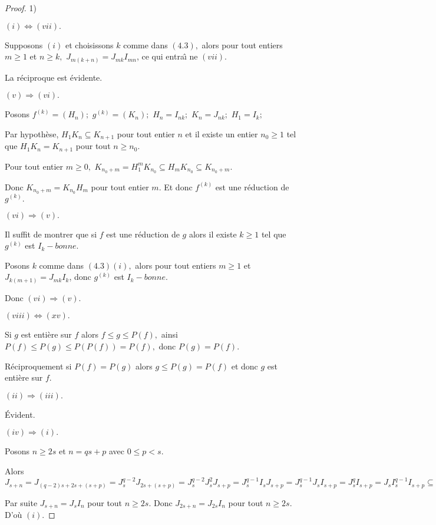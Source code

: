 \begin{proof}
	
	1)
	
	$(i)\Longleftrightarrow (vii).$
	
	Supposons $(i)$ et choisissons $k$ comme dans $(4.3),$ alors pour tout
	entiers $m\geq 1$ et $n\geq k,$ $J_{m(k+n)}=J_{mk}I_{mn}$, ce qui entra\^{\i}%
	ne $(vii).$
	
	La réciproque est évidente.
	
	$(v)\Longrightarrow (vi).$
	
	Posons $f^{(k)}=(H_{n});$ $g^{(k)}=(K_{n});$ $H_{n}=I_{nk};$ $K_{n}=J_{nk};$ 
	$H_{1}=I_{k};$
	
	Par hypothèse, $H_{1}K_{n}\subseteq K_{n+1}$ pour tout entier $n$ et il
	existe un entier $n_{0}\geq 1$ tel que $H_{1}K_{n}=K_{n+1}$ pour tout $n\geq
	n_{0}.$
	
	Pour tout entier $m\geq 0,$ $K_{n_{0}+m}=H_{1}^{m}K_{n_{0}}\subseteq
	H_{m}K_{n_{0}}\subseteq K_{n_{0}+m}.$
	
	Donc $K_{n_{0}+m}=K_{n_{0}}H_{m}$ pour tout entier $m.$ Et donc $f^{(k)}$
	est une réduction de $g^{(k)}.$
	
	$(vi)\Longrightarrow (v).$
	
	Il suffit de montrer que si $f$ est une réduction de $g$ alors il existe 
	$k\geq 1$ tel que $g^{(k)}$ est $I_{k}-bonne.$
	
	Posons $k$ comme dans $(4.3)(i),$ alors pour tout entiers $m\geq 1$ et  $J_{k(m+1)}=J_{mk}I_{k}$, donc $g^{(k)}$ est $I_{k}-bonne.$
	
	Donc $(vi)\Longrightarrow (v).$
	
	$(viii)\Longleftrightarrow (xv).$
	
	Si $g$ est entière sur $f$ alors $f\leq g\leq P(f),$ ainsi $P(f)\leq
	P(g)\leq P(P(f))=P(f),$ donc $P(g)=P(f).$
	
	Réciproquement si $P(f)=P(g)$ alors $g\leq P(g)=P(f)$ et donc $g$ est entière sur $f.$
	
	$(ii)\Longrightarrow (iii).$
	
	Évident.
	
	$(iv)\Longrightarrow (i).$
	
	Posons $n\geq 2s$ et $n=qs+p$ avec $0\leq p<s.$
	
	Alors $J_{s+n}=J_{(q-2)s+2s+(s+p)}=J_{s}^{q-2}J_{2s+(s+p)}=J_{s}^{q-2}J_{s}^{2}J_{s+p}=J_{s}^{q-1}I_{s}J_{s+p}=J_{s}^{q-1}J_{s}I_{s+p}=J_{s}^{q}I_{s+p}=J_{s}I_{s}^{q-1}I_{s+p}\subseteq J_{s}I_{n}\subseteq J_{s+n}.
	$
	
	Par suite $J_{s+n}=J_{s}I_{n}$ pour tout $n\geq 2s.$ Donc $%
	J_{2s+n}=J_{2s}I_{n}$ pour tout $n\geq 2s.$ D'où $(i).$
	

\end{proof}

